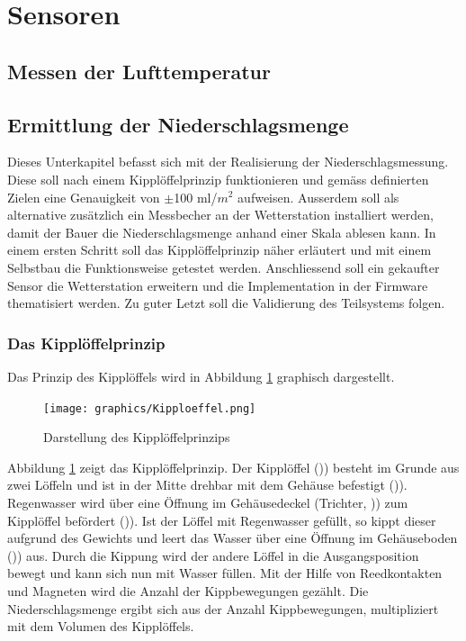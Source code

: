 \section{Sensoren}

\subsection{Messen der Lufttemperatur}
\subsection{Ermittlung der Niederschlagsmenge}
Dieses Unterkapitel befasst sich mit der Realisierung der Niederschlagsmessung. Diese soll nach einem Kipplöffelprinzip funktionieren und gemäss definierten Zielen eine Genauigkeit von $\pm$100 ml/$m^2$ aufweisen. Ausserdem soll als alternative zusätzlich ein Messbecher an der Wetterstation installiert werden, damit der Bauer die Niederschlagsmenge anhand einer Skala ablesen kann. In einem ersten Schritt soll das Kipplöffelprinzip näher erläutert und mit einem Selbstbau die Funktionsweise getestet werden. Anschliessend soll ein gekaufter Sensor die Wetterstation erweitern und die Implementation in der Firmware thematisiert werden. Zu guter Letzt soll die Validierung des Teilsystems folgen.
\subsubsection*{Das Kipplöffelprinzip}
Das Prinzip des Kipplöffels wird in Abbildung \ref{fig:Kipp} graphisch dargestellt.

\begin{figure}[h]
\centering
\texttt{[image: graphics/Kipploeffel.png]}
\caption{Darstellung des Kipplöffelprinzips}
\label{fig:Kipp}
\end{figure}

Abbildung \ref{fig:Kipp} zeigt das Kipplöffelprinzip. Der Kipplöffel ()\grqq) besteht im Grunde aus zwei Löffeln und ist in der Mitte drehbar mit dem Gehäuse befestigt ()\grqq). Regenwasser wird über eine Öffnung im Gehäusedeckel (Trichter, )\grqq) zum Kipplöffel befördert ()\grqq). Ist der Löffel mit Regenwasser gefüllt, so kippt dieser aufgrund des Gewichts und leert das Wasser über eine Öffnung im Gehäuseboden ()\grqq) aus. Durch die Kippung wird der andere Löffel in die Ausgangsposition bewegt und kann sich nun mit Wasser füllen. Mit der Hilfe von Reedkontakten und Magneten wird die Anzahl der Kippbewegungen gezählt. Die Niederschlagsmenge ergibt sich aus der Anzahl Kippbewegungen, multipliziert mit dem Volumen des Kipplöffels.
\newpage

